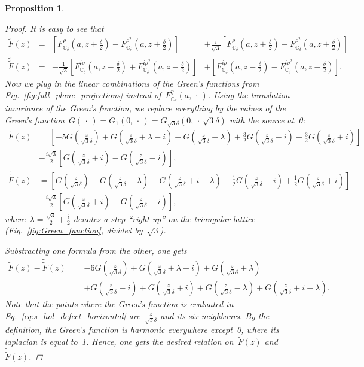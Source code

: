 \documentclass[reqno,11pt,a4paper]{amsart}
\newtheorem{proposition}{Proposition}[section]
\theoremstyle{remark}
\newcommand{\C}{\mathbb{C}}
\begin{document}
\begin{proposition}
\begin{proof}
It is easy to see that
\begin{align}
\tilde{F}(z) &=&
\left[ F_{\C_\delta}^\rho(a,z+\tfrac{\delta}{2}) - F_{\C_\delta}^{\rho^2}(a,z+\tfrac{\delta}{2})\right]
&+\tfrac{i}{\sqrt{3}}\left[ F_{\C_\delta}^\rho(a,z+\tfrac{\delta}{2}) + F_{\C_\delta}^{\rho^2}(a,z+\tfrac{\delta}{2}) \right]\\
\tilde{\tilde{F}}(z) &=&
-\tfrac{1}{\sqrt{3}}\left[ F_{\C_\delta}^{i\rho}(a,z-\tfrac{\delta}{2}) + F_{\C_\delta}^{i\rho^2}(a,z-\tfrac{\delta}{2})\right]
&+\left[ F_{\C_\delta}^{i\rho}(a,z-\tfrac{\delta}{2}) - F_{\C_\delta}^{i\rho^2}(a,z-\tfrac{\delta}{2}) \right].
\end{align}
Now we plug in the linear combinations of the Green's functions from Fig.~\ref{fig:full_plane_projections}
instead of~$F_{\C_\delta}^\eta(a,\,\cdot\,)$.
Using the translation invariance of the Green's function, we replace everything by the values
of the Green's function~$G(\,\cdot\,) =G_{1}(0,\,\cdot\,)= G_{\sqrt{3}\delta}(0,\,\cdot\,\sqrt{3}\delta)$ with the source at~0:
\begin{align*}
\tilde{F}(z) &=
\left[ -5G(\tfrac{z}{\sqrt{3}\delta}) + G(\tfrac{z}{\sqrt{3}\delta}+\lambda - i) + G(\tfrac{z}{\sqrt{3}\delta}+\lambda) + \tfrac{3}{2}G(\tfrac{z}{\sqrt{3}\delta}-i)
+ \tfrac{3}{2}G(\tfrac{z}{\sqrt{3}\delta}+i) \right]\\
&-\tfrac{i\sqrt{3}}{2}\left[ G(\tfrac{z}{\sqrt{3}\delta}+i) - G(\tfrac{z}{\sqrt{3}\delta}-i)\right],\\
\tilde{\tilde{F}}(z) &=
\left[G(\tfrac{z}{\sqrt{3}\delta}) -  G(\tfrac{z}{\sqrt{3}\delta}-\lambda) -  G(\tfrac{z}{\sqrt{3}\delta}+i-\lambda)
+\tfrac{1}{2} G(\tfrac{z}{\sqrt{3}\delta}-i) +\tfrac{1}{2} G(\tfrac{z}{\sqrt{3}\delta}+i)  \right]\\
&-\tfrac{i\sqrt{3}}{2}\left[  G(\tfrac{z}{\sqrt{3}\delta}+i) - G(\tfrac{z}{\sqrt{3}\delta}-i) \right],
\end{align*}
where~$\lambda = \tfrac{\sqrt{3}}{2} + \tfrac{i}{2}$ denotes a step ``right-up'' on the triangular
lattice (Fig.~\ref{fig:Green_function}, divided by~$\sqrt{3}$).

Substracting one formula from the other, one gets
\begin{align}
\label{eq:s_hol_defect_horizontal}
\tilde{F}(z) - \tilde{\tilde{F}}(z) =
&-6G(\tfrac{z}{\sqrt{3}\delta}) + G(\tfrac{z}{\sqrt{3}\delta}+\lambda - i) + G(\tfrac{z}{\sqrt{3}\delta}+\lambda) \\
&+G(\tfrac{z}{\sqrt{3}\delta}-i) + G(\tfrac{z}{\sqrt{3}\delta}+i) + G(\tfrac{z}{\sqrt{3}\delta}-\lambda) +  G(\tfrac{z}{\sqrt{3}\delta}+i-\lambda).
\end{align}
Note that the points where the Green's function is evaluated in Eq.~\ref{eq:s_hol_defect_horizontal}
are~$\tfrac{z}{\sqrt{3}\delta}$ and its six neighbours.
By the definition, the Green's function is harmonic everywhere except~0,
where its laplacian is equal to~1.
Hence, one gets the desired relation on~$\tilde{F}(z)$ and~$\tilde{\tilde{F}}(z)$.
\end{proof}
\end{proposition}
\end{document}

